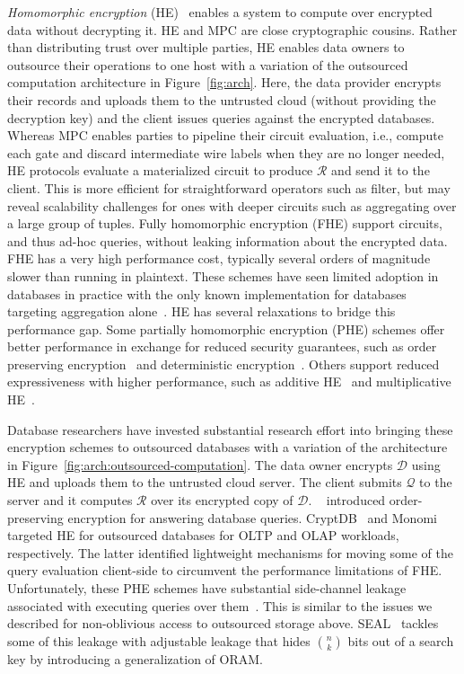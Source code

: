 \documentclass[11pt]{article}
\newcommand{\db}{$\mathcal{D}$\xspace}
\newcommand{\answer}{$\mathcal{R}$\xspace}
\newcommand{\query}{$\mathcal{Q}$\xspace}
\begin{document}
{\it Homomorphic encryption} (HE)~\cite{gentry2009fully} enables a system to compute over encrypted data without decrypting it.    HE and MPC are close cryptographic cousins.  Rather than distributing trust over multiple parties, HE enables data owners to outsource their operations to one host with a variation of the outsourced computation architecture in Figure~\ref{fig:arch}.  Here, the data provider encrypts their records and uploads them to the untrusted cloud (without providing the decryption key) and the client issues queries against the encrypted databases.   Whereas MPC enables parties to pipeline their circuit evaluation, i.e., compute each gate and discard intermediate wire labels when they are no longer needed, HE protocols evaluate a materialized circuit to produce \answer and send it to the client.  This is more efficient for straightforward operators such as filter, but may reveal scalability challenges for ones with deeper circuits such as aggregating over a large group of tuples.  Fully homomorphic encryption (FHE)  support circuits, and thus ad-hoc queries, without leaking information about the encrypted data.  FHE has a very high performance cost, typically several orders of magnitude slower than running in plaintext.  These schemes have seen limited adoption in databases in practice with the only known implementation for databases targeting aggregation alone~\cite{ren2022heda}.  HE has several relaxations to bridge this performance gap.  Some partially homomorphic encryption (PHE) schemes offer better performance in exchange for reduced security guarantees, such as order preserving encryption~\cite{boldyreva2009order,agrawal2004order} and deterministic encryption~\cite{boldyreva2008notions, bellare2008deterministic}.  Others support reduced expressiveness with higher performance, such as additive HE~\cite{paillier1999public} and multiplicative HE~\cite{elgamal1985public,rivest1978method}.

Database researchers have invested substantial research effort into bringing these encryption schemes to outsourced databases with a variation of the architecture in Figure~\ref{fig:arch:outsourced-computation}.  The data owner encrypts \db using HE and uploads them to the untrusted cloud server.  The client submits \query to the server and it computes \answer over its encrypted copy of \db.  ~\cite{agrawal2004order} introduced order-preserving encryption for answering database queries.  CryptDB~\cite{popa2011cryptdb}
and Monomi~\cite{tu2013processing} targeted HE for outsourced databases for OLTP and OLAP workloads, respectively.  The latter identified lightweight mechanisms for moving some of the query evaluation client-side to circumvent the performance limitations of FHE.  Unfortunately, these PHE schemes have substantial side-channel leakage associated with executing queries over them~\cite{naveed2015inference, bindschaedler2017tao}.  This is similar to the issues we described for non-oblivious access to outsourced storage above.  SEAL~\cite{demertzis2020seal} tackles some of this leakage with adjustable leakage that hides $\binom{n}{k}$ bits out of a search key by introducing a generalization of ORAM.
\end{document}
